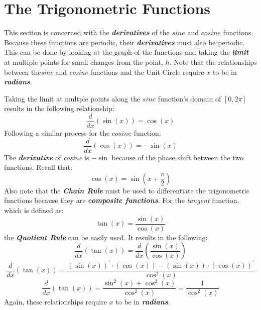 \section{The Trigonometric Functions}
This section is concerned with the \textbf{\textit{derivatives}} of the $sine$ and $cosine$ functions. Because these functions are periodic, their \textbf{\textit{derivatives}} must also be periodic. This can be done by looking at the graph of the functions and taking the \textbf{\textit{limit}} at multiple points for small changes from the point, $h$. Note that the relationships between the\textit{sine} and \textit{cosine} functions and the Unit Circle require $x$ to be in \textbf{\textit{radians}}.

\vspace{0.1in}
Taking the limit at multple points along the $sine$ function's domain of $[0, 2\pi]$ results in the following relationship:
%
\begin{equation}
\frac{d}{dx}\left(\sin(x)\right) = \cos(x)
\end{equation}
%
Following a similar process for the $cosine$ function:
%
\begin{equation}
\frac{d}{dx}\left(\cos(x)\right) = -\sin(x)
\end{equation}
%
The \textbf{\textit{derivative}} of \textit{cosine} is $-\sin$ because of the phase shift between the two functions. Recall that:
%
\begin{equation}
\cos(x) = \sin\left(x + \frac{\pi}{2}\right)
\end{equation}
%
Also note that the \textbf{\textit{Chain Rule}} must be used to differentiate the trigonometric functions because they are \textbf{\textit{composite functions}}. For the \textit{tangent} function, which is defined as:
%
\begin{equation}
\tan(x) = \frac{\sin(x)}{\cos(x)}
\end{equation}
%
the \textbf{\textit{Quotient Rule}} can be easily used. It results in the following:
%
\begin{equation}
\frac{d}{dx}\left(\tan(x)\right) = \frac{d}{dx}\left(\frac{\sin(x)}{\cos(x)}\right)
\end{equation}
%
\begin{equation}
\frac{d}{dx}\left(\tan(x)\right) = \frac{\left(\sin(x)\right)^\prime \cdot \left(\cos(x)\right) - \left(\sin(x)\right) \cdot \left(\cos(x)\right)^\prime}{\cos^2(x)}
\end{equation}
%
\begin{equation}
\frac{d}{dx}\left(\tan(x)\right) = \frac{\sin^2(x) + \cos^2(x)}{\cos^2(x)} = \frac{1}{\cos^2(x)}
\end{equation}
%
Again, these relationships require $x$ to be in \textbf{\textit{radians}}.

